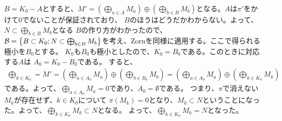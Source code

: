 \documentclass[9pt]{ltjsarticle}
\begin{document}
\begin{myproof}
\begin{itemize}
      $B=K_0-A$とすると、$M' = (\bigoplus_{a\in A}M_a)\oplus (\bigoplus_{b\in B}M_b)$となる。$A$は$\pi'$をかけて0でないことが保証されており、
      $B$のほうはどうだかわからない。よって、$N\subset \bigoplus_{b\in B}M_b$となる
      $B$の作り方がわかったので、
      $\mathcal B=\left\{B\subset K_0 ; N \subset \bigoplus_{b\in B}M_b\right\}$を考え、Zornを同様に適用する。ここで得られる極小を$B_0$とする。
      $K_0$も$B_0$も極小としたので、$K_0 = B_0$である。このときに対応する$A$は
      $A_0 = K_0 - B_0$である。
      すると、
      \begin{align}
        \bigoplus_{k\in K_0} = M'
        =
        (\bigoplus_{a\in A_0} M_a)\oplus (\bigoplus_{b\in B_0}M_b)
        =
        (\bigoplus_{a\in A_0} M_a) \oplus (\bigoplus_{k\in K_0}M_k)
      \end{align}
      である。よって、$\bigoplus_{a\in A_0}M_a = 0$であり、$A_0 = \emptyset$である。
      つまり、$\pi$で消えない$M_k$が存在せず、$k\in K_0$について
      $\pi(M_k)=0$となり、$M_k \subset N$ということになった。よって、$\bigoplus_{k\in K_0} M_k \subset N$となる。
      よって、$\bigoplus_{k\in K_0}M_k = N$となった。
  \end{itemize}
\end{myproof}
\end{document}
